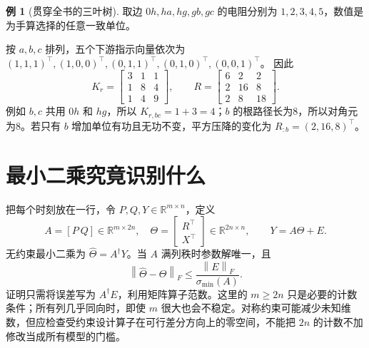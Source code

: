 \documentclass[UTF8,11pt,fontset=fandol,openany,oneside]{ctexbook}
\newcommand{\R}{\mathbb{R}}
\newcommand{\norm}[1]{\left\lVert#1\right\rVert}
\theoremstyle{definition}
\newtheorem{example}[theorem]{例}
\theoremstyle{remark}
\numberwithin{equation}{chapter}
\begin{document}
\begin{example}[贯穿全书的三叶树]\label{ex:tb-tree}
取边 $0h,ha,hg,gb,gc$ 的电阻分别为 $1,2,3,4,5$，数值是为手算选择的任意一致单位。
\begin{center}
\end{center}
按 $a,b,c$ 排列，五个下游指示向量依次为
$(1,1,1)^\top,(1,0,0)^\top,(0,1,1)^\top,(0,1,0)^\top,(0,0,1)^\top$。
因此
\begin{equation}
 K_r=\begin{bmatrix}3&1&1\\1&8&4\\1&4&9\end{bmatrix},\qquad
 R=\begin{bmatrix}6&2&2\\2&16&8\\2&8&18\end{bmatrix}.
 \label{eq:tb-toy-k}
\end{equation}
例如 $b,c$ 共用 $0h$ 和 $hg$，所以 $K_{r,bc}=1+3=4$；$b$ 的根路径长为8，所以对角元为8。若只有 $b$ 增加单位有功且无功不变，平方压降的变化为 $R_{:b}=(2,16,8)^\top$。
\end{example}

\section{最小二乘究竟识别什么}
把每个时刻放在一行，令 $P,Q,Y\in\R^{m\times n}$，定义
\begin{equation}
 A=[P\ Q]\in\R^{m\times2n},\quad
 \Theta=\begin{bmatrix}R^\top\\X^\top\end{bmatrix}\in\R^{2n\times n},
 \qquad Y=A\Theta+E.
\end{equation}
无约束最小二乘为 $\widehat\Theta=A^\dagger Y$。当 $A$ 满列秩时参数解唯一，且
\begin{equation}
 \norm{\widehat\Theta-\Theta}_F
 \leq\frac{\norm{E}_F}{\sigma_{\min}(A)}.
 \label{eq:tb-ls-bound}
\end{equation}
证明只需将误差写为 $A^\dagger E$，利用矩阵算子范数。这里的 $m\geq2n$ 只是必要的计数条件；所有列几乎同向时，即使 $m$ 很大也会不稳定。对称约束可能减少未知维数，但应检查受约束设计算子在可行差分方向上的零空间，不能把 $2n$ 的计数不加修改当成所有模型的门槛。
\end{document}
